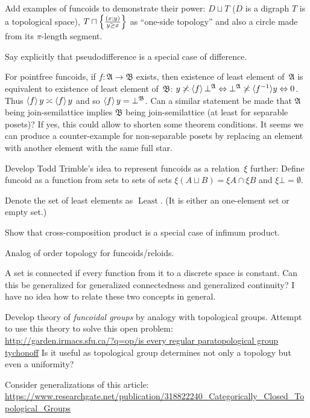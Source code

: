 \documentclass{amsart}
\begin{document}
Add examples of funcoids to demonstrate their power:
$D\sqcup T$ ($D$ is a digraph $T$ is a topological space),
$T\sqcap\left\{ \frac{(x;y)}{y\ge x}\right\}$ as ``one-side topology'' and also a circle made from its $\pi$-length segment.

Say explicitly that pseudodifference is a special case of difference.

For pointfree funcoids, if $f:\mathfrak{A}\rightarrow\mathfrak{B}$ exists,
then existence of least element of~$\mathfrak{A}$ is equivalent to existence of least element of~$\mathfrak{B}$:
$y \not\asymp \left\langle f\right\rangle \bot^{\mathfrak{A}} \Leftrightarrow
\bot^{\mathfrak{A}} \not\asymp \langle f^{- 1} \rangle y \Leftrightarrow 0$. Thus
$\left\langle f\right\rangle y \asymp \left\langle f\right\rangle y$ and so $\left\langle f\right\rangle y =
\bot^{\mathfrak{B}}$.
Can a similar statement be made that $\mathfrak{A}$ being join-semilattice implies $\mathfrak{B}$ being join-semilattice
(at least for separable posets)? If yes, this could allow to shorten some theorem conditions.
It seems we can produce a counter-example for non-separable posets by replacing an element with another element with the same full star.

Develop Todd Trimble's idea to represent funcoids as a relation~$\xi$ further:
Define funcoid as a function from sets to sets of sets
$\xi(A\sqcup B) = \xi A\cap\xi B$ and $\xi\bot=\emptyset$.

Denote the set of least elements as $\operatorname{Least}$. (It is either an
one-element set or empty set.)

Show that cross-composition product is a special case of infimum product.

Analog of order topology for funcoids/reloids.

A set is connected if every function from it to a discrete space is constant. Can this be generalized for generalized connectedness and generalized continuity? I have no idea how to relate these two concepts in general.

Develop theory of \emph{funcoidal groups} by analogy with topological groups.
Attempt to use this theory to solve this open problem:\\
\url{http://garden.irmacs.sfu.ca/?q=op/is every regular paratopological group tychonoff}
Is it useful as topological group determines not only a topology but even a uniformity?

Consider generalizations of this article: \\
\url{https://www.researchgate.net/publication/318822240_Categorically_Closed_Topological_Groups}
\end{document}
